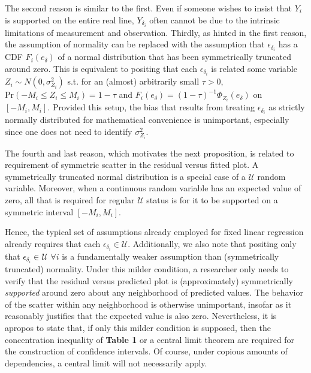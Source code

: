 \documentclass[12pt]{amsart}
\theoremstyle{plain}%
\theoremstyle{definition}
\theoremstyle{remark}
\numberwithin{equation}{section}
\begin{document}
The second reason is similar to the first. Even if someone wishes to insist that $Y_i$ is supported on the entire real line, $Y_{\delta_i}$ often cannot be due to the intrinsic limitations of measurement and observation. Thirdly, as hinted in the first reason, the assumption of normality can be replaced with the assumption that $\epsilon_{\delta_i}$ has a CDF $F_i(e_{\delta})$ of a normal distribution that has been symmetrically truncated around zero. This is equivalent to positing that each $\epsilon_{\delta_i}$ is related some variable $Z_i \sim N(0, \sigma^2_{Z_i})$ s.t. for an (almost) arbitrarily small $\tau > 0$, $\text{Pr}(-M_i \leq Z_i \leq M_i ) = 1 - \tau$ and $F_i(e_{\delta}) = (1-\tau)^{-1} \Phi_{Z_i}(e_{\delta})$ on $[-M_i, M_i]$. Provided this setup, the bias that results from treating $\epsilon_{\delta_i}$ as strictly normally distributed for mathematical convenience is unimportant, especially since one does not need to identify $\sigma^2_{Z_i}$.

The fourth and last reason, which motivates the next proposition, is related to requirement of symmetric scatter in the residual versus fitted plot. A symmetrically truncated normal distribution is a special case of a $\mathcal{U}$ random variable. Moreover, when a continuous random variable has an expected value of zero, all that is required for regular $\mathcal{U}$ status is for it to be supported on a symmetric interval $[-M_i, M_i]$.

Hence, the typical set of assumptions already employed for fixed linear regression already requires that each $\epsilon_{\delta_i} \in \mathcal{U}$. Additionally, we also note that positing only that $\epsilon_{\delta_i} \in \mathcal{U}$ $\forall i$ is a fundamentally weaker assumption than (symmetrically truncated) normality. Under this milder condition, a researcher only needs to verify that the residual versus predicted plot is (approximately) symmetrically \textit{supported} around zero about any neighborhood of predicted values. The behavior of the scatter within any neighborhood is otherwise unimportant, insofar as it reasonably justifies that the expected value is also zero. Nevertheless, it is apropos to state that, if only this milder condition is supposed, then the concentration inequality of \textbf{Table 1} or a central limit theorem are required for the construction of confidence intervals. Of course, under copious amounts of dependencies, a central limit will not necessarily apply.
\end{document}
